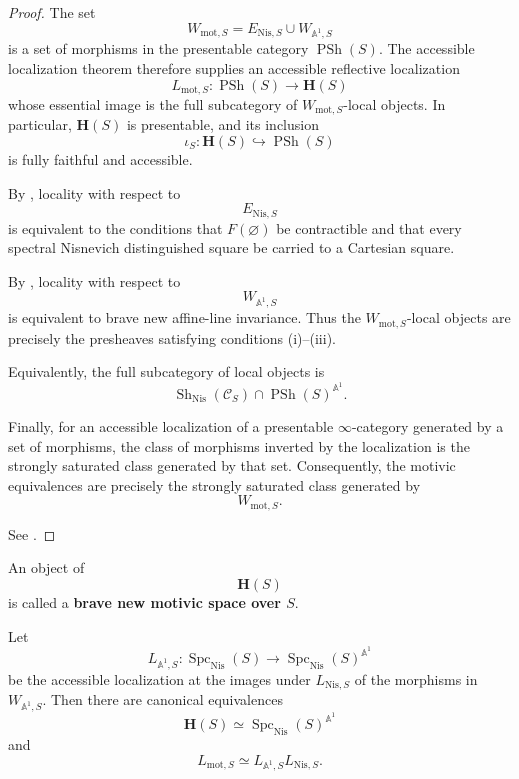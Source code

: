 \begin{proof}
The set
\[
    W_{\mathrm{mot},S}
    =
    E_{\mathrm{Nis},S}
    \cup
    W_{\mathbb A^1,S}
\]
is a set of morphisms in the presentable category
\(\operatorname{PSh}(S)\). The accessible localization theorem
therefore supplies an accessible reflective localization
\[
    L_{\mathrm{mot},S}
    \colon
    \operatorname{PSh}(S)
    \longrightarrow
    \mathbf H(S)
\]
whose essential image is the full subcategory of
\(W_{\mathrm{mot},S}\)-local objects. In particular,
\(\mathbf H(S)\) is presentable, and its inclusion
\[
    \iota_S
    \colon
    \mathbf H(S)
    \hookrightarrow
    \operatorname{PSh}(S)
\]
is fully faithful and accessible.

By
,
locality with respect to
\[
    E_{\mathrm{Nis},S}
\]
is equivalent to the conditions that \(F(\varnothing)\) be
contractible and that every spectral Nisnevich distinguished square be
carried to a Cartesian square.

By
,
locality with respect to
\[
    W_{\mathbb A^1,S}
\]
is equivalent to brave new affine-line invariance. Thus the
\(W_{\mathrm{mot},S}\)-local objects are precisely the presheaves
satisfying conditions (i)--(iii).

Equivalently, the full subcategory of local objects is
\[
    \operatorname{Sh}_{\mathrm{Nis}}(\mathcal C_S)
    \cap
    \operatorname{PSh}(S)^{\mathbb A^1}.
\]

Finally, for an accessible localization of a presentable
\(\infty\)-category generated by a set of morphisms, the class of
morphisms inverted by the localization is the strongly saturated class
generated by that set. Consequently, the motivic equivalences are
precisely the strongly saturated class generated by
\[
    W_{\mathrm{mot},S}.
\]

See
\cite{LurieHTT,KhanBraveNewMotivicI}.
\end{proof}

\begin{definition}
\label{def:brave-new-motivic-space}
An object of
\[
    \mathbf H(S)
\]
is called a \textbf{brave new motivic space over \(S\)}.
\end{definition}

\begin{proposition}
\label{prop:two-stage-brave-new-motivic-localization}
Let
\[
    L_{\mathbb A^1,S}
    \colon
    \operatorname{Spc}_{\mathrm{Nis}}(S)
    \longrightarrow
    \operatorname{Spc}_{\mathrm{Nis}}(S)^{\mathbb A^1}
\]
be the accessible localization at the images under
\(L_{\mathrm{Nis},S}\) of the morphisms in
\(W_{\mathbb A^1,S}\).  Then there are canonical equivalences
\[
    \mathbf H(S)
    \simeq
    \operatorname{Spc}_{\mathrm{Nis}}(S)^{\mathbb A^1}
\]
and
\[
    L_{\mathrm{mot},S}
    \simeq
    L_{\mathbb A^1,S}
    L_{\mathrm{Nis},S}.
\]
\end{proposition}

